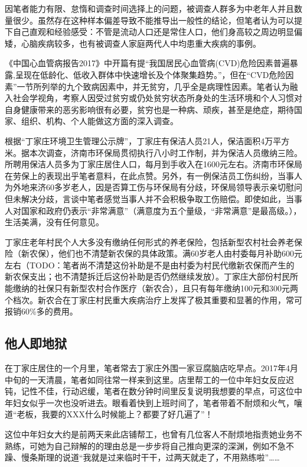   因笔者能力有限、怠惰和调查时间选择上的问题，被调查人群多为中老年人并且数量很少。虽然存在这种样本偏差导致不能推导出一般性的结论，但笔者认为可以提下自己直观和经验感受：不管是流动人口还是常住人口，他们身高较之周边明显偏矮，心脑疾病较多，也有被调查人家庭两代人中均患重大疾病的事例。

  《中国心血管病报告2017》中开篇有提“我国居民心血管病(CVD)危险因素普遍暴露,呈现在低龄化、低收入群体中快速增长及个体聚集趋势。”，但在“CVD危险因素”一节所列举的九个致病因素中，并无贫穷，几乎全是病理性因素。笔者认为融入社会学视角，考察人因受过贫穷或仍处贫穷状态所身处的生活环境和个人习惯对自身健康带来的恶劣影响很有必要，贫穷也是一种病、顽疾，甚至是绝症，期待国家、组织、机构、个人能做这方面的深入调查。

  根据“丁家庄环境卫生管理公示牌”，丁家庄有保洁人员21人，保洁面积4万平方米。据本次调查，济南市环保局贯彻执行八小时工作制，并为保洁人员缴纳三险。所聘用保洁人员多为丁家庄居住人口，每月到手收入在1600元左右。济南市环保局在劳保上的表现出乎笔者意料，在此点赞。另外，有一例保洁员工伤纠纷，当事人为外地来济60多岁老人，因是否算工伤与环保局有分歧，环保局领导表示亲切慰问但未解决分歧，言谈中笔者感觉当事人并不会积极争取工伤赔偿。即使如此，当事人对国家和政府仍表示“非常满意”（满意度为五个量级，“非常满意”是最高级。），生活美满，没有任何意见。

  丁家庄老年村民个人大多没有缴纳任何形式的养老保险，包括新型农村社会养老保险（新农保），他们也不清楚新农保的具体政策。满60岁老人由村委每月补助600元左右（TODO：笔者尚不清楚这份补助是不是由村委为村民代缴新农保而产生的新农保支出；也不清楚拆迁后这份补助是否仍然继续发放）。丁家庄大部份村民所能缴纳的社保只有新型农村合作医疗（新农合），且只有每年缴纳100元和300元两个档次。新农合在丁家庄村民重大疾病治疗上发挥了极其重要和显著的作用，常可报销60\%多的费用。

  \subsection{他人即地狱}

  在丁家庄居住的一个月里，笔者常去丁家庄外围一家豆腐脑店吃早点。2017年4月中旬的一天清晨，笔者如同往常一样来到这里。店里帮工的一位中年妇女反应迟钝，记性不佳，行动迟缓，笔者在数分钟时间里反复说明我想要的早点，可这位中年妇女似乎一次也没听进去。眼看着快到上班时间了，笔者带着不耐烦和火气，嚷道“老板，我要的XXX什么时候能上？都要了好几遍了”！

  这位中年妇女大约是前两天来此店铺帮工，也曾有几位客人不耐烦地指责她业务不熟练，可她为自己辩解的的理由总是一步步将自己推向更深的深渊，例如不急不躁、慢条斯理的说道“我就是过来临时干干，过两天就走了，不用熟练啦”……

